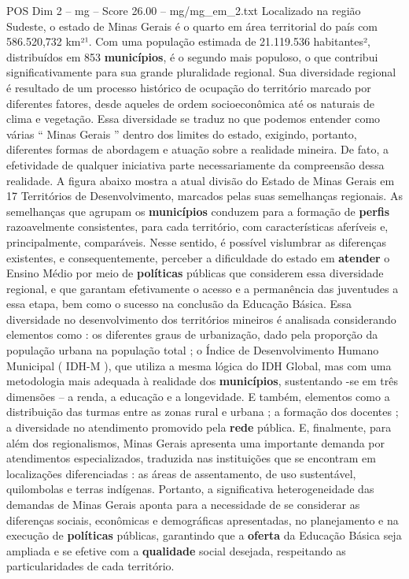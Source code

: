 \begin{textsample}{POS Dim 2 – mg – Score 26.00 – mg/mg\_em\_2.txt}
Localizado na região Sudeste, o estado de Minas Gerais é o quarto em área territorial do país com 586.520,732 km²¹.
Com uma população estimada de 21.119.536 habitantes², distribuídos em 853 \textbf{municípios}, é o segundo mais populoso, o que contribui significativamente para sua grande pluralidade regional.
Sua diversidade regional é resultado de um processo histórico de ocupação do território marcado por diferentes fatores, desde aqueles de ordem socioeconômica até os naturais de clima e vegetação.
Essa diversidade se traduz no que podemos entender como várias “ Minas Gerais ” dentro dos limites do estado, exigindo, portanto, diferentes formas de abordagem e atuação sobre a realidade mineira.
De fato, a efetividade de qualquer iniciativa parte necessariamente da compreensão dessa realidade.
A figura abaixo mostra a atual divisão do Estado de Minas Gerais em 17 Territórios de Desenvolvimento, marcados pelas suas semelhanças regionais.
As semelhanças que agrupam os \textbf{municípios} conduzem para a formação de \textbf{perfis} razoavelmente consistentes, para cada território, com características aferíveis e, principalmente, comparáveis.
Nesse sentido, é possível vislumbrar as diferenças existentes, e consequentemente, perceber a dificuldade do estado em \textbf{atender} o Ensino Médio por meio de \textbf{políticas} públicas que considerem essa diversidade regional, e que garantam efetivamente o acesso e a permanência das juventudes a essa etapa, bem como o sucesso na conclusão da Educação Básica.
Essa diversidade no desenvolvimento dos territórios mineiros é analisada considerando elementos como : os diferentes graus de urbanização, dado pela proporção da população urbana na população total ; o Índice de Desenvolvimento Humano Municipal ( IDH-M ), que utiliza a mesma lógica do IDH Global, mas com uma metodologia mais adequada à realidade dos \textbf{municípios}, sustentando -se em três dimensões – a renda, a educação e a longevidade.
E também, elementos como a distribuição das turmas entre as zonas rural e urbana ; a formação dos docentes ; a diversidade no atendimento promovido pela \textbf{rede} pública.
E, finalmente, para além dos regionalismos, Minas Gerais apresenta uma importante demanda por atendimentos especializados, traduzida nas instituições que se encontram em localizações diferenciadas : as áreas de assentamento, de uso sustentável, quilombolas e terras indígenas.
Portanto, a significativa heterogeneidade das demandas de Minas Gerais aponta para a necessidade de se considerar as diferenças sociais, econômicas e demográficas apresentadas, no planejamento e na execução de \textbf{políticas} públicas, garantindo que a \textbf{oferta} da Educação Básica seja ampliada e se efetive com a \textbf{qualidade} social desejada, respeitando as particularidades de cada território.

\end{textsample}
